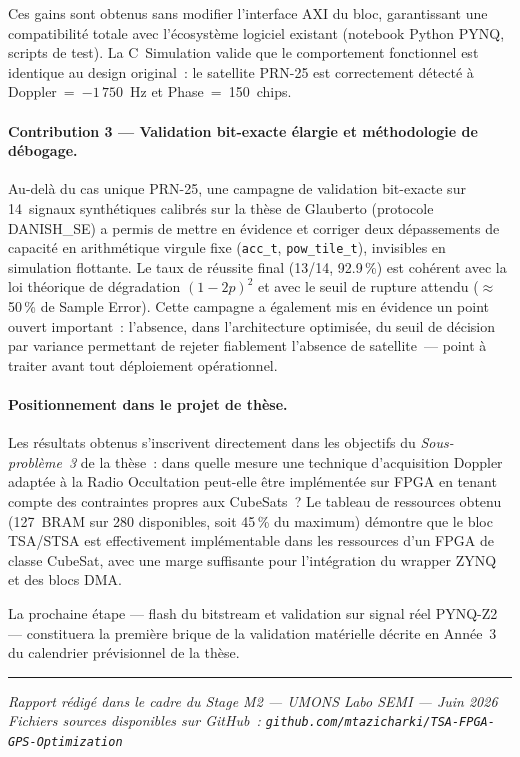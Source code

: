\documentclass[11pt,a4paper]{article}
\providecommand{\og}{\guillemotleft{}}
\providecommand{\fg}{\guillemotright{}}
\begin{document}
Ces gains sont obtenus sans modifier l'interface AXI du bloc, garantissant une compatibilité totale avec l'écosystème logiciel existant (notebook Python PYNQ, scripts de test). La C~Simulation valide que le comportement fonctionnel est identique au design original~: le satellite PRN-25 est correctement détecté à Doppler~=~$-1\,750$~Hz et Phase~=~150~chips.

\paragraph{Contribution 3 — Validation bit-exacte élargie et méthodologie de débogage.}
Au-delà du cas unique PRN-25, une campagne de validation bit-exacte sur 14~signaux synthétiques calibrés sur la thèse de Glauberto (protocole DANISH\_SE) a permis de mettre en évidence et corriger deux dépassements de capacité en arithmétique virgule fixe (\texttt{acc\_t}, \texttt{pow\_tile\_t}), invisibles en simulation flottante. Le taux de réussite final (13/14, 92.9\,\%) est cohérent avec la loi théorique de dégradation $(1-2p)^2$ et avec le seuil de rupture attendu ($\approx$50\,\% de Sample Error). Cette campagne a également mis en évidence un point ouvert important~: l'absence, dans l'architecture optimisée, du seuil de décision par variance permettant de rejeter fiablement l'absence de satellite~--- point à traiter avant tout déploiement opérationnel.

\paragraph{Positionnement dans le projet de thèse.}
Les résultats obtenus s'inscrivent directement dans les objectifs du \textit{Sous-problème~3} de la thèse~: \og{}dans quelle mesure une technique d'acquisition Doppler adaptée à la Radio Occultation peut-elle être implémentée sur FPGA en tenant compte des contraintes propres aux CubeSats~?\fg{} Le tableau de ressources obtenu (127~BRAM sur 280 disponibles, soit 45\,\% du maximum) démontre que le bloc TSA/STSA est effectivement implémentable dans les ressources d'un FPGA de classe CubeSat, avec une marge suffisante pour l'intégration du wrapper ZYNQ et des blocs DMA.

La prochaine étape --- flash du bitstream et validation sur signal réel PYNQ-Z2 --- constituera la première brique de la validation matérielle décrite en Année~3 du calendrier prévisionnel de la thèse.

\vspace{0.5cm}
\hrule
\vspace{0.3cm}
\begin{center}
\small\textit{Rapport rédigé dans le cadre du Stage M2 --- UMONS Labo SEMI --- Juin 2026\\
Fichiers sources disponibles sur GitHub~: \texttt{github.com/mtazicharki/TSA-FPGA-GPS-Optimization}}
\end{center}
\end{document}
